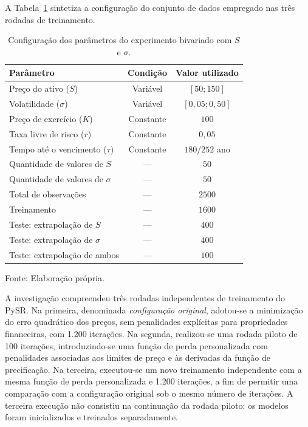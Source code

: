 A Tabela~\ref{tab:parametros_bivariada} sintetiza a configuração do conjunto de dados empregado nas três rodadas de treinamento.

\begin{table}[htbp]
    \centering
    \caption{Configuração dos parâmetros do experimento bivariado com $S$ e $\sigma$.}
    \label{tab:parametros_bivariada}
    \begin{tabular}{lcc}
        \hline
        \textbf{Parâmetro} & \textbf{Condição} & \textbf{Valor utilizado} \\
        \hline
        Preço do ativo ($S$) & Variável & $[50;150]$ \\
        Volatilidade ($\sigma$) & Variável & $[0{,}05;0{,}50]$ \\
        Preço de exercício ($K$) & Constante & $100$ \\
        Taxa livre de risco ($r$) & Constante & $0{,}05$ \\
        Tempo até o vencimento ($\tau$) & Constante & $180/252$ ano \\
        Quantidade de valores de $S$ & --- & $50$ \\
        Quantidade de valores de $\sigma$ & --- & $50$ \\
        \hline
        Total de observações & --- & $2500$ \\
        Treinamento & --- & $1600$ \\
        Teste: extrapolação de $S$ & --- & $400$ \\
        Teste: extrapolação de $\sigma$ & --- & $400$ \\
        Teste: extrapolação de ambos & --- & $100$ \\
        \hline
    \end{tabular}
    \vspace{0.2cm}
    {\footnotesize Fonte: Elaboração própria.\par}
\end{table}

A investigação compreendeu três rodadas independentes de treinamento do PySR. Na primeira, denominada \textit{configuração original}, adotou-se a minimização do erro quadrático dos preços, sem penalidades explícitas para propriedades financeiras, com 1.200 iterações. Na segunda, realizou-se uma rodada piloto de 100 iterações, introduzindo-se uma função de perda personalizada com penalidades associadas aos limites de preço e às derivadas da função de precificação. Na terceira, executou-se um novo treinamento independente com a mesma função de perda personalizada e 1.200 iterações, a fim de permitir uma comparação com a configuração original sob o mesmo número de iterações. A terceira execução não consistiu na continuação da rodada piloto: os modelos foram inicializados e treinados separadamente.

